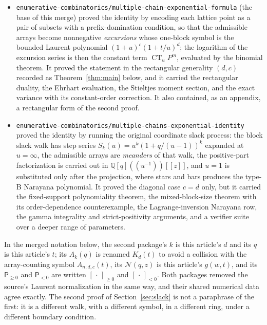 \documentclass[11pt]{article}
\numberwithin{equation}{section}
\theoremstyle{definition}
\newcommand{\Q}{\mathbb Q}
\newcommand{\CT}{\operatorname{CT}_u}
\newcommand{\Adc}[1]{A_{#1;d,c}}
\begin{document}
\begin{itemize}[leftmargin=1.4em,itemsep=0.25em]
\item \texttt{enumerative-combinatorics/multiple-chain-exponential-formula}
 (the base of this merge) proved the identity by encoding each lattice point
 as a pair of subsets with a prefix-domination condition, so that the
 admissible arrays become nonnegative \emph{excursions} whose one-block symbol
 is the bounded Laurent polynomial $(1+u)^c(1+t/u)^d$; the logarithm of the
 excursion series is then the constant term $\CT P^m$, evaluated by the
 binomial theorem. It proved the statement in the rectangular generality
 $(d,c)$ recorded as Theorem~\ref{thm:main} below, and it carried the
 rectangular duality, the Ehrhart evaluation, the Stieltjes moment section,
 and the exact variance with its constant-order correction. It also contained,
 as an appendix, a rectangular form of the second proof.
\item \texttt{enumerative-combinatorics/multiple-chains-exponential-identity}
 proved the identity by running the original coordinate slack process: the
 block slack walk has step series $S_k(u)=u^k(1+q/(u-1))^k$ expanded at
 $u=\infty$, the admissible arrays are \emph{meanders} of that walk, the
 positive-part factorization is carried out in $\Q[q]((u^{-1}))[[z]]$, and
 $u=1$ is substituted only after the projection, where stars and bars
 produces the type-B Narayana polynomial. It proved the diagonal case $c=d$
 only, but it carried the fixed-support polynomiality theorem, the
 mixed-block-size theorem with its order-dependence counterexample, the
 Lagrange-inversion Narayana row, the gamma integrality and strict-positivity
 arguments, and a verifier suite over a deeper range of parameters.
\end{itemize}

\noindent
In the merged notation below, the second package's $k$ is this article's $d$
and its $q$ is this article's $t$; its $A_k(q)$ is renamed $K_d(t)$ to avoid a
collision with the array-counting symbol $\Adc n(t)$, its $\mathcal N(q,z)$ is
this article's $g(w,t)$, and its $\mathsf P_{\geq0}$ and $\mathsf P_{<0}$ are
written $[\,\cdot\,]_{\geq0}$ and $[\,\cdot\,]_{<0}$. Both packages removed
the source's Laurent normalization in the same way, and their shared numerical
data agree exactly. The second proof of Section~\ref{sec:slack} is not a
paraphrase of the first: it is a different walk, with a different symbol, in a
different ring, under a different boundary condition.
\end{document}
